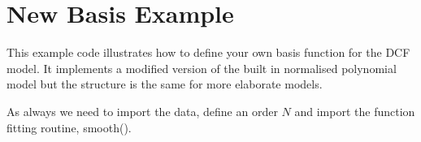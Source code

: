 \documentclass[letterpaper,10pt,english]{sphinxmanual}
\begin{document}
\section{New Basis Example}
\label{\detokenize{source/maxsmooth:new-basis-example}}
This example code illustrates how to define your own basis function for the
DCF model.
It implements a modified version of the built in normalised polynomial model
but the structure is the same for more elaborate models.

As always we need to import the data, define an order \({N}\)
and import the function fitting routine, smooth().

\begin{sphinxVerbatim}[commandchars=\\\{\}]
   
   

  
  

\end{sphinxVerbatim}
\end{document}
